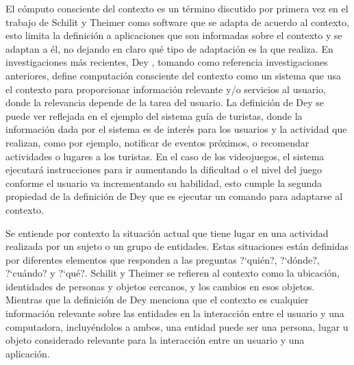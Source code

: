 El c\'omputo consciente del contexto es un t\'ermino discutido por primera vez en el trabajo de Schilit y Theimer \cite{schillit1994disseminating} como software que se adapta de acuerdo al contexto, esto limita la definici\'on a aplicaciones que son informadas sobre el contexto y se adaptan a \'el, no dejando en claro qu\'e tipo de adaptaci\'on es la que realiza. En investigaciones m\'as recientes, Dey \cite{dey2001conceptual}, tomando como referencia investigaciones anteriores, define computaci\'on consciente del contexto como un sistema que usa el contexto para proporcionar informaci\'on relevante y/o servicios al usuario, donde la relevancia depende de la tarea del usuario. La definici\'on de Dey se puede ver reflejada en el ejemplo del sistema gu\'ia de turistas, donde la informaci\'on dada por el sistema es de inter\'es para los usuarios y la actividad que realizan, como por ejemplo, notificar de eventos pr\'oximos, o recomendar actividades o lugares a los turistas. En el caso de los videojuegos, el sistema ejecutar\'a instrucciones para ir aumentando la dificultad o el nivel del juego conforme el usuario va incrementando su habilidad, esto cumple la segunda propiedad de la definici\'on de Dey que es ejecutar un comando para adaptarse al contexto.

Se entiende por contexto la situaci\'on actual que tiene lugar en una actividad realizada por un sujeto o un grupo de entidades. Estas situaciones est\'an definidas por diferentes elementos que responden a las preguntas ?`qui\'en?, ?`d\'onde?, ?`cu\'ando? y ?`qu\'e?. Schilit y Theimer \cite{schillit1994disseminating} se refieren al contexto como la ubicaci\'on, identidades de personas y objetos cercanos, y los cambios en esos objetos. Mientras que la definici\'on de Dey \cite{dey2001conceptual} menciona que el contexto es cualquier informaci\'on relevante sobre las entidades en la interacci\'on entre el usuario y una computadora, incluy\'endolos a ambos, una entidad puede ser una persona, lugar u objeto considerado relevante para la interacci\'on entre un usuario y una aplicaci\'on.
